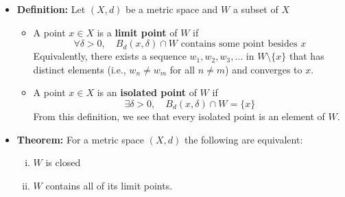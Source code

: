 \documentclass[11pt,twoside]{report}
\begin{document}
\begin{itemize}
\begin{itemize}
\item \textbf{Definition:} Let $(X, d)$ be a metric space and $W$ a subset of $X$
\begin{itemize}
\item A point $x\in X$ is a \textbf{limit point} of $W$ if
\[
 \forall \delta > 0, \quad B_d(x, \delta) \cap W \text{ contains some point besides $x$}
\]
Equivalently, there exists a sequence $w_1, w_2, w_3 , \dots$ in $W \setminus \{x\}$ that has distinct elements (i.e., $w_n \ne w_m$ for all $n \ne m$) and converges to $x$. 

\item A point $x\in X$ is an \textbf{isolated point} of $W$ if %
\[
\exists \delta > 0, \quad B_d(x, \delta) \cap W = \{ x\}
\]
From this definition, %
we see that every isolated point is an element of $W$. 


\end{itemize}




%

\item \textbf{Theorem:} For a metric space $(X, d)$ the following are equivalent: 
\begin{enumerate}[(i)]
\item $W$ is closed %
\item $W$ contains all of its limit points. 
\end{enumerate}


\end{itemize}
\end{itemize}
\end{document}
